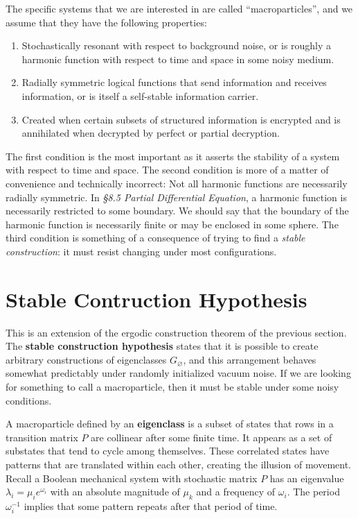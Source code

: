 \documentclass[10pt, a5paper, twoside, openright]{memoir}
\begin{document}
The specific systems that we are interested in are called ``macroparticles'', and we assume that they have the following properties:
\begin{enumerate}
\item Stochastically resonant with respect to background noise, or is roughly a harmonic function with respect to time and space in some noisy medium.
\item Radially symmetric logical functions that send information and receives information, or is itself a self-stable information carrier.
\item Created when certain subsets of structured information is encrypted and is annihilated when decrypted by perfect or partial decryption.
\end{enumerate}
The first condition is the most important as it asserts the stability of a system with respect to time and space. The second condition is more of a matter of convenience and technically incorrect: Not all harmonic functions are necessarily radially symmetric. In \textit{\S 8.5 Partial Differential Equation}, a harmonic function is necessarily restricted to some boundary. We should say that the boundary of the harmonic function is necessarily finite or may be enclosed in some sphere. The third condition is something of a consequence of trying to find a \textit{stable construction}: it must resist changing under most configurations.

\section{Stable Contruction Hypothesis}
This is an extension of the ergodic construction theorem of the previous section. The \textbf{stable construction hypothesis} states that it is possible to create arbitrary constructions of eigenclasses $G_\varnothing$, and this arrangement behaves somewhat predictably under randomly initialized vacuum noise. If we are looking for something to call a macroparticle, then it must be stable under some noisy conditions.

A macroparticle defined by an \textbf{eigenclass} is a subset of states that rows in a transition matrix $P$ are collinear after some finite time. It appears as a set of substates that tend to cycle among themselves. These correlated states have patterns that are translated within each other, creating the illusion of movement. Recall a Boolean mechanical system with stochastic matrix $P$ has an eigenvalue $\lambda_i = \mu_i e^{\omega_i}$ with an absolute magnitude of $\mu_k$ and a frequency of $\omega_i$. The period $\omega_i^{-1}$ implies that some pattern repeats after that period of time. 
\end{document}
